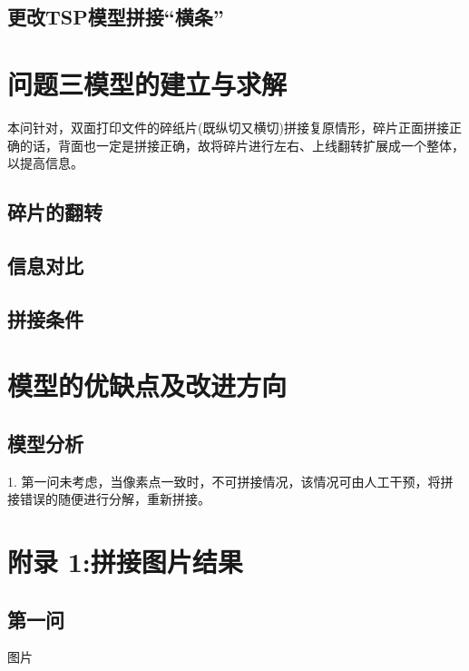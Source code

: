 \documentclass[12pt]{article}
\begin{document}
{       \subsection{更改TSP模型拼接“横条”}
       
    
       {\centering\section{问题三模型的建立与求解}}
       本问针对，双面打印文件的碎纸片(既纵切又横切)拼接复原情形，碎片正面拼接正确的话，背面也一定是拼接正确，故将碎片进行左右、上线翻转扩展成一个整体，以提高信息。
       \subsection{碎片的翻转}
         \par
       \subsection{信息对比}
         \par
       \subsection{拼接条件}
         \par
       {\centering\section{模型的优缺点及改进方向}}
       \subsection{模型分析}
         \par 1.	第一问未考虑，当像素点一致时，不可拼接情况，该情况可由人工干预，将拼接错误的随便进行分解，重新拼接。
      

   }

   \begin{thebibliography}{5}
   
    \end{thebibliography}


   {\centering\section{附录 1:拼接图片结果}}
 \subsection{第一问}
    图片
\end{document}
